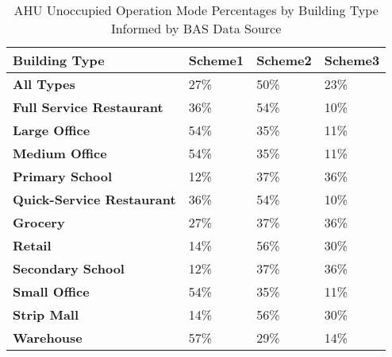\begin{table}[ht!]
\centering
\small
\caption[AHU Unoccupied Operation Mode Percentages]{AHU Unoccupied Operation Mode Percentages by Building Type Informed by BAS Data Source}
\label{tab:unnoc_ahu_scheme_prev}
\begin{tabular}{|l|l|l|l|}
\hline
\textbf{Building Type}              & \textbf{Scheme1} & \textbf{Scheme2} & \textbf{Scheme3} \\ \hline
\textbf{All   Types}                & 27\%             & 50\%             & 23\%             \\ \hline
\textbf{Full Service   Restaurant}  & 36\%             & 54\%             & 10\%             \\ \hline
\textbf{Large   Office}             & 54\%             & 35\%             & 11\%             \\ \hline
\textbf{Medium   Office}            & 54\%             & 35\%             & 11\%             \\ \hline
\textbf{Primary   School}          & 12\%             & 37\%             & 36\%             \\ \hline
\textbf{Quick-Service   Restaurant} & 36\%             & 54\%             & 10\%             \\ \hline
\textbf{Grocery}                   & 27\%             & 37\%             & 36\%             \\ \hline
\textbf{Retail}                     & 14\%             & 56\%             & 30\%             \\ \hline
\textbf{Secondary   School}        & 12\%             & 37\%             & 36\%             \\ \hline
\textbf{Small   Office}             & 54\%             & 35\%             & 11\%             \\ \hline
\textbf{Strip   Mall}               & 14\%             & 56\%             & 30\%             \\ \hline
\textbf{Warehouse}                 & 57\%             & 29\%             & 14\%             \\ \hline
\end{tabular}
\end{table}